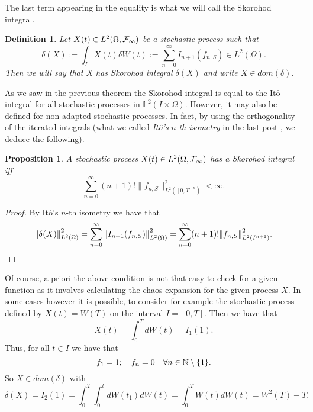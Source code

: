 \documentclass[12pt]{article}
\newtheorem{proposition}{Proposition}
\newtheorem{definition}{Definition}
\begin{document}
The last term appearing in the equality is what we will call the Skorohod integral.
\begin{definition}
    Let $X(t)\in L^2(\Omega,\mathcal{F}_\infty)$ be a  stochastic process such that
    \begin{equation*}
    	\delta(X):=\int_{I} X(t)\delta W(t):=\sum_{n=0}^{\infty} I_{n+1}(f_{n,S})\in L^2(\Omega).
    \end{equation*}
    Then we will say that $X$ has Skorohod integral $\delta(X)$ and write $X\in dom(\delta)$.
\end{definition}
As we saw in the previous theorem the Skorohod integral is equal to the Itô integral for all stochastic processes in $\mathbb{L}^2(I\times\Omega)$. However, it may also be defined for non-adapted stochastic processes. In fact, by using the orthogonality of the iterated integrals (what we called \emph{Itô's} $n$-\emph{th isometry} in the last post \cite{Chaosblog}, we deduce the following).
\begin{proposition}
    A stochastic process $X(t)\in L^2(\Omega,\mathcal{F}_\infty)$ has a Skorohod integral iff
    \begin{equation*}
    	\sum_{n=0}^{\infty} (n+1)!\|f_{n,S}\|^2_{L^2([0,T]^n)}<\infty.
    \end{equation*}

\end{proposition}
\begin{proof}
    By Itô's $n$-th isometry we have that
    \begin{equation*}
    	\norm{\delta(X)}^2_{L^2(\Omega)}=\sum_{n=0}^{\infty}  \norm{I_{n+1}(f_{n,S})}_{L^2(\Omega)}^2=\sum_{n=0}^{\infty} (n+1)!\norm{f_{n,S}}_{L^2(I^{n+1})}^2.
    \end{equation*}
\end{proof}
Of course, a priori the above condition is not that easy to check for a given function as it involves calculating the chaos expansion for the given process $X$. In some cases however it is possible, to consider for example the stochastic process defined by $X(t)=W(T)$ on the interval $I=[0,T]$. Then we have that
\begin{equation*}
    X(t)=\int_{0}^T dW(t)=I_1(1).
\end{equation*}
Thus, for all $t\in I$ we have that
\begin{equation*}
    f_1=1;\quad f_n=0\quad\forall n \in \mathbb{N} \setminus \{1\}  .
\end{equation*}
So $X\in dom(\delta)$ with
\begin{equation*}
    \delta(X)= I_2(1)=\int_{0}^T\int_{0}^t dW(t_1)dW(t)=\int_{0}^T W(t) dW(t)= W^2(T)-T.
\end{equation*}
\end{document}
